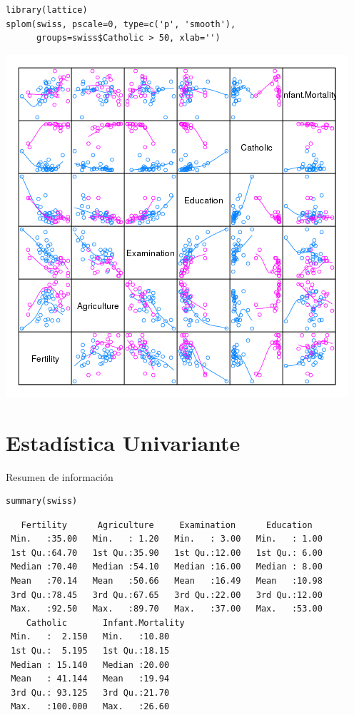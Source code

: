 \documentclass[xcolor={usenames,svgnames,dvipsnames}]{beamer}
\begin{document}
\begin{frame}[fragile,label=sec-1-3]{}
 \lstset{language=R,label= ,caption= ,numbers=none}
\begin{lstlisting}
library(lattice)
splom(swiss, pscale=0, type=c('p', 'smooth'),
      groups=swiss$Catholic > 50, xlab='')
\end{lstlisting}

\includegraphics[height=0.5\textheight]{figs/splomSwiss.png}
\end{frame}

\section{Estadística Univariante}
\label{sec-2}

\begin{frame}[fragile,label=sec-2-1]{Resumen de  información}
 \lstset{language=R,label= ,caption= ,numbers=none}
\begin{lstlisting}
summary(swiss)
\end{lstlisting}

\begin{verbatim}
   Fertility      Agriculture     Examination      Education    
 Min.   :35.00   Min.   : 1.20   Min.   : 3.00   Min.   : 1.00  
 1st Qu.:64.70   1st Qu.:35.90   1st Qu.:12.00   1st Qu.: 6.00  
 Median :70.40   Median :54.10   Median :16.00   Median : 8.00  
 Mean   :70.14   Mean   :50.66   Mean   :16.49   Mean   :10.98  
 3rd Qu.:78.45   3rd Qu.:67.65   3rd Qu.:22.00   3rd Qu.:12.00  
 Max.   :92.50   Max.   :89.70   Max.   :37.00   Max.   :53.00  
    Catholic       Infant.Mortality
 Min.   :  2.150   Min.   :10.80   
 1st Qu.:  5.195   1st Qu.:18.15   
 Median : 15.140   Median :20.00   
 Mean   : 41.144   Mean   :19.94   
 3rd Qu.: 93.125   3rd Qu.:21.70   
 Max.   :100.000   Max.   :26.60
\end{verbatim}
\end{frame}
\end{document}
